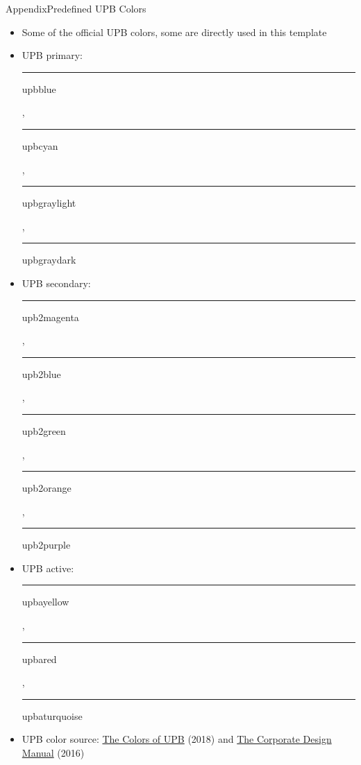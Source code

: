 \documentclass{beamer}
\begin{document}
\begin{frame}{Appendix}{Predefined UPB Colors}
	\begin{itemize}
		\item Some of the official UPB colors, some are directly used in this template
		\item UPB primary:
		      {\color{upbblue}\rule{.7cm}{.4cm} upbblue},
		      {\color{upbcyan}\rule{.7cm}{.4cm} upbcyan},
		      {\color{upbgraylight}\rule{.7cm}{.4cm} upbgraylight},
		      {\color{upbgraydark}\rule{.7cm}{.4cm} upbgraydark}
		\item UPB secondary:
		      {\color{upb2magenta}\rule{.7cm}{.4cm} upb2magenta},
		      {\color{upb2blue}\rule{.7cm}{.4cm} upb2blue},
		      {\color{upb2green}\rule{.7cm}{.4cm} upb2green},
		      {\color{upb2orange}\rule{.7cm}{.4cm} upb2orange},
		      {\color{upb2purple}\rule{.7cm}{.4cm} upb2purple}
		\item UPB active:
		      {\color{upbayellow}\rule{.7cm}{.4cm} upbayellow},
		      {\color{upbared}\rule{.7cm}{.4cm} upbared},
		      {\color{upbaturquoise}\rule{.7cm}{.4cm} upbaturquoise}
		\item UPB color source:
		      \href{https://www.uni-paderborn.de/en/university/press-communications-marketing/design-vorgaben-templates/colors}{The Colors of UPB} (2018) and
		      \href{https://www.uni-paderborn.de/en/university/press-communications-marketing/corporate-design-manual}{The Corporate Design Manual} (2016)
	\end{itemize}
\end{frame}
\end{document}
